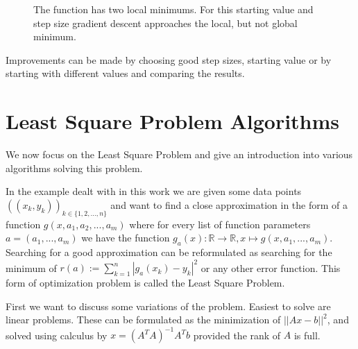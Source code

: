 \begin{figure}[h]
	\centering
	\caption{The function has two local minimums. For this starting value and step size gradient descent approaches the local, but not global minimum.}
	\label{fig:grad_descent_global_min_not_found}
\end{figure}

Improvements can be made by choosing good step sizes, starting value or by starting with different values and comparing the results.

\section{Least Square Problem Algorithms}


We now focus on the Least Square Problem and give an introduction into various algorithms solving this problem.

In the example dealt with in this work we are given some data points $((x_k, y_k))_{k \in \{1, 2, ..., n\}}$ and want to find a close approximation in the form of a function $g(x, a_1, a_2, ..., a_m)$ where for every list of function parameters $a = (a_1, ..., a_m)$ we have the function $g_a(x) : \mathbb{R} \rightarrow \mathbb{R}, x \mapsto g(x, a_1, ..., a_m)$. Searching for a good approximation can be reformulated as searching for the minimum of $r(a) := \sum_{k=1}^{n} |g_a(x_k) - y_k|^2$ or any other error function. This form of optimization problem is called the Least Square Problem.

First we want to discuss some variations of the problem. Easiest to solve are linear problems. These can be formulated as the minimization of $||Ax - b||^2$, and solved using calculus by $x=(A^TA)^{-1}A^Tb$ provided the rank of $A$ is full.

